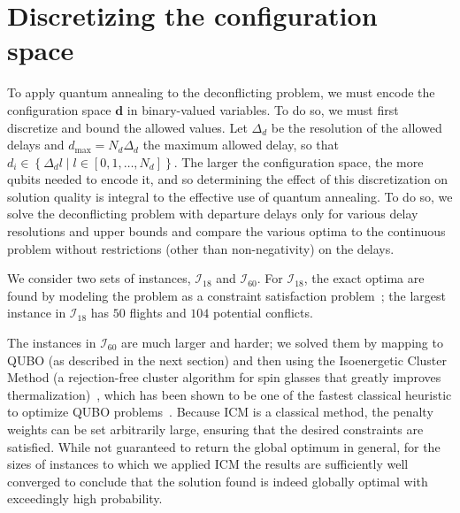 \section{Discretizing the configuration space}
\label{sec:discretization}
To apply quantum annealing to the deconflicting problem, we must encode the configuration space $\mathbf d$ in binary-valued variables.
To do so, we must first discretize and bound the allowed values.
Let $\Delta_d$ be the resolution of the allowed delays and $d_{\max} = N_d \Delta_d$ the maximum allowed delay, so that $d_i \in \left\{\Delta_d l \middle| l \in [0, 1, \ldots, N_d]\right\}$.
The larger the configuration space, the more qubits needed to encode it, and so determining the effect of this discretization on solution quality is integral to the effective use of quantum annealing.
To do so, we solve the deconflicting problem with departure delays only for various delay resolutions and upper bounds and compare the various optima to the continuous problem without restrictions (other than non-negativity) on the delays.

We consider two sets of instances, $\mathcal I_{18}$ and $\mathcal I_{60}$.
For $\mathcal I_{18}$, the exact optima are found by modeling the problem as a constraint satisfaction problem~\cite{numberjack}; the largest instance in $\mathcal I_{18}$ has $50$ flights and $104$ potential conflicts.

The instances in $\mathcal I_{60}$ are much larger and harder; we solved them by mapping to QUBO (as described in the next section) and then using the Isoenergetic Cluster Method (a
rejection-free cluster algorithm for spin glasses that greatly improves
thermalization)~\cite{zhu2015}, which has been shown to be one of the fastest
classical heuristic to optimize QUBO problems~\cite{mandra2016}.
Because ICM is a classical method, the penalty weights can be set arbitrarily large, ensuring that the desired constraints are satisfied.
While not guaranteed to return the global optimum in general, for the sizes of instances to which we applied ICM the results are sufficiently well converged to conclude that the solution found is indeed globally optimal with exceedingly high probability.


